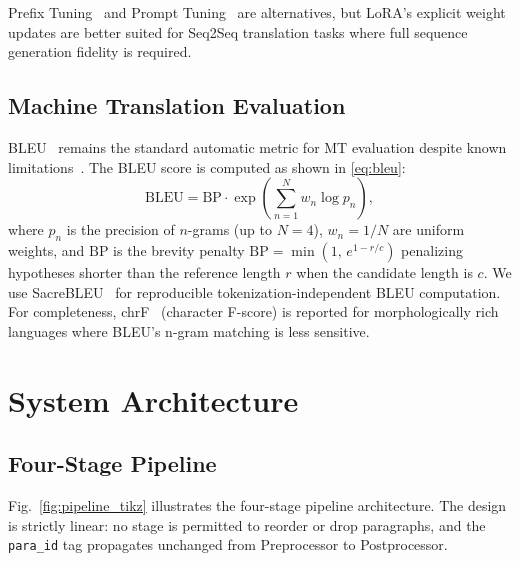 \documentclass[conference]{IEEEtran}
\begin{document}
Prefix Tuning~\cite{li2021prefix} and Prompt Tuning~\cite{lester2021power} are
alternatives, but LoRA's explicit weight updates are better suited for
Seq2Seq translation tasks where full sequence generation fidelity is required.

\subsection{Machine Translation Evaluation}

BLEU~\cite{papineni2002bleu} remains the standard automatic metric for MT evaluation
despite known limitations~\cite{callison2006re}.
The BLEU score is computed as shown in \eqref{eq:bleu}:
\begin{equation}
  \mathrm{BLEU} = \mathrm{BP} \cdot \exp\!\left(\sum_{n=1}^{N} w_n \log p_n\right),
  \label{eq:bleu}
\end{equation}
where $p_n$ is the precision of $n$-grams (up to $N=4$), $w_n = 1/N$ are uniform
weights, and $\mathrm{BP}$ is the brevity penalty
$\mathrm{BP} = \min\!\left(1,\, e^{1 - r/c}\right)$ penalizing hypotheses shorter
than the reference length $r$ when the candidate length is $c$.
We use SacreBLEU~\cite{post2018call} for reproducible tokenization-independent BLEU
computation.
For completeness, chrF~\cite{popovic2015chrf} (character F-score) is reported for
morphologically rich languages where BLEU's n-gram matching is less sensitive.

\section{System Architecture}

\subsection{Four-Stage Pipeline}

Fig.~\ref{fig:pipeline_tikz} illustrates the four-stage pipeline architecture.
The design is strictly linear: no stage is permitted to reorder or drop paragraphs,
and the \texttt{para\_id} tag propagates unchanged from Preprocessor to Postprocessor.
\end{document}
